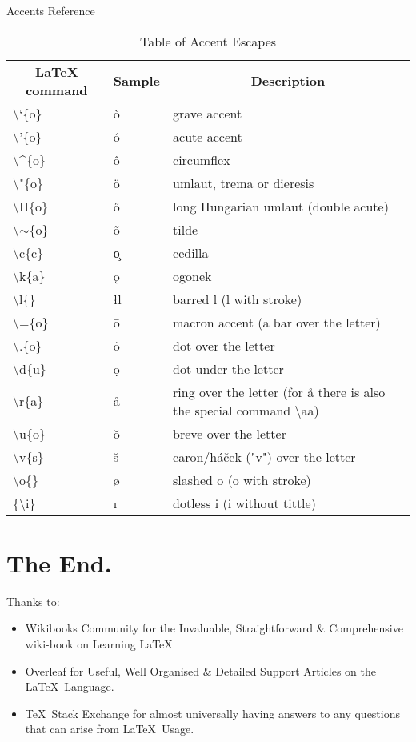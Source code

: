 \documentclass{beamer}
\begin{document}
\begin{frame}{Accents Reference}
\tiny{
\begin{table}[]
\begin{tabular}{lll}
\multicolumn{1}{c}{\textbf{LaTeX command}} & \multicolumn{1}{c}{\textbf{Sample}} & \multicolumn{1}{c}{\textbf{Description}} \\
\textbackslash{}`\{o\} & \`{o} & grave accent \\
\textbackslash{}'\{o\} & \'{o} & acute accent \\
\textbackslash{}\textasciicircum{}\{o\} & \^{o} & circumflex \\
\textbackslash{}"\{o\} & \"{o} & umlaut, trema or dieresis \\
\textbackslash{}H\{o\} & \H{o} & long Hungarian umlaut (double acute) \\
\textbackslash{}$\sim$\{o\} & \~{o} & tilde \\
\textbackslash{}c\{c\} &\c{o} & cedilla \\
\textbackslash{}k\{a\} & \k{o} & ogonek \\
\textbackslash{}l\{\} & \l{l} & barred l (l with stroke) \\
\textbackslash{}=\{o\} & \={o} & macron accent (a bar over the letter) \\
\textbackslash{}.\{o\} & \.{o} & dot over the letter \\
\textbackslash{}d\{u\} & \d{o}& dot under the letter \\
\textbackslash{}r\{a\} & \r{a} & ring over the letter (for å there is also the special command \textbackslash{}aa) \\
\textbackslash{}u\{o\} & \u{o} & breve over the letter \\
\textbackslash{}v\{s\} & \v{s} & caron/háček ("v") over the letter \\
\textbackslash{}o\{\} & \o{} & slashed o (o with stroke) \\
\{\textbackslash{}i\} & \i{} & dotless i (i without tittle)
\end{tabular}
\caption{Table of Accent Escapes}
\label{tabAccentChars}
\end{table}}%
\end{frame}

\section{The End.}

\begin{frame}{Thanks to:}
\begin{itemize}

\item Wikibooks Community for the Invaluable, Straightforward \& Comprehensive wiki-book on Learning \LaTeX
\item Overleaf for Useful, Well Organised \& Detailed Support Articles on the \LaTeX~Language.
\item \TeX~Stack Exchange for almost universally having answers to any questions that can arise from \LaTeX~Usage.

\end{itemize}

\end{frame}
\end{document}
